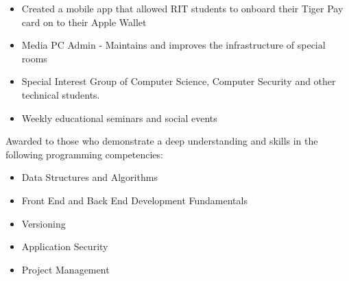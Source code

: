 \documentclass[10pt,a4paper,ragged2e,withhyper]{altacv}
\begin{document}
\begin{paracol}{2}
\begin{itemize}
    
    \end{itemize}

\smallskip \smallskip
  
      
     
  \newline
\divider
    
    
    \begin{itemize}
    
    \item Created a mobile app that allowed RIT students to onboard their Tiger Pay card on to their Apple Wallet
    
    \end{itemize}

\smallskip \smallskip
  
       
\smallskip \smallskip
       
 

    
    \switchcolumn
    \smallskip
    

    
\begin{itemize}
\item Media PC Admin - Maintains and improves the infrastructure of special rooms
\item Special Interest Group of Computer Science, Computer Security and other technical students. 
\item Weekly educational seminars and social events
\end{itemize}

   
    \smallskip 
    
Awarded to those who demonstrate a deep understanding and skills in the following programming competencies: 
\begin{itemize}
\item Data Structures and Algorithms 
\item Front End and Back End Development Fundamentals
\item Versioning
\item Application Security
\item Project Management
\end{itemize}







   
    \end{paracol}
    
 
    
    
    
\end{document}
